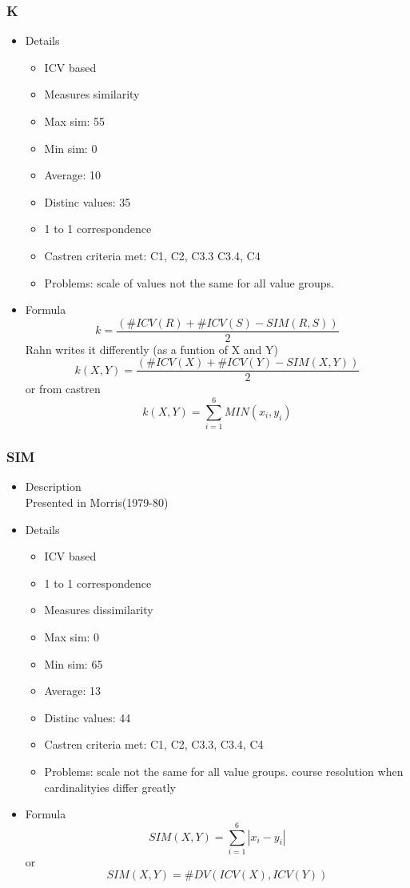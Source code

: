 \documentclass{article}
\begin{document}
\subsubsection{K}
\label{sec-6-1-1}
\begin{itemize}

\item Details
\label{sec-6-1-1-1}%
\begin{itemize}
\item ICV based
\item Measures similarity
\item Max sim: 55
\item Min sim: 0
\item Average: 10
\item Distinc values: 35
\item 1 to 1 correspondence
\item Castren criteria met: C1, C2, C3.3 C3.4, C4
\item Problems: scale of values not the same for all value groups.
\end{itemize}

\item Formula\\
\label{sec-6-1-1-2}%
$$
k=\frac{\left(\#ICV\left(R\right)+\#ICV\left(S\right)-SIM\left(R,S\right)\right)}{2}
$$ 
Rahn writes it differently (as a funtion of X and Y) 
$$
k\left(X,Y\right)=\frac{\left(\#ICV\left(X\right)+\#ICV\left(Y\right)-SIM\left(X,Y\right)\right)}{2}
$$
or from castren
$$ k(X,Y)= \sum_{i=1}^{6}{MIN(x_{i},y_{i})} $$
\end{itemize} %
\subsubsection{SIM}
\label{sec-6-1-2}
\begin{itemize}

\item Description\\
\label{sec-6-1-2-1}%
Presented in Morris(1979-80)

\item Details
\label{sec-6-1-2-2}%
\begin{itemize}
\item ICV based
\item 1 to 1 correspondence
\item Measures dissimilarity
\item Max sim: 0
\item Min sim: 65
\item Average: 13
\item Distinc values: 44
\item Castren criteria met: C1, C2, C3.3, C3.4, C4
\item Problems: scale not the same for all value groups. course resolution
  when cardinalityies differ greatly
\end{itemize}

\item Formula\\
\label{sec-6-1-2-3}%
$$ 
SIM\left(X,Y\right)=\sum_{i=1}^{6}\left|x_{i}-y_{i}\right| 
$$ 
or 
$$
SIM\left(X,Y\right)=\#DV\left(ICV\left(X\right),ICV\left(Y\right)\right)
$$
\end{itemize} %
\end{document}
